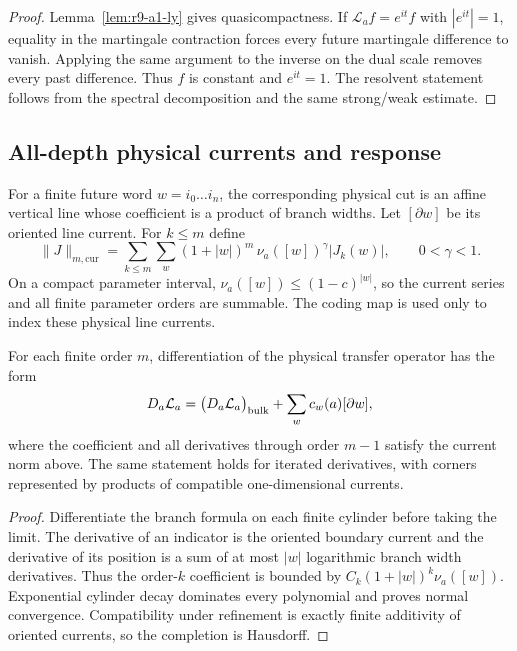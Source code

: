 \begin{proof}
Lemma~\ref{lem:r9-a1-ly} gives quasicompactness.  If
$\mathcal L_af=e^{it}f$ with $|e^{it}|=1$, equality in the martingale
contraction forces every future martingale difference to vanish.  Applying the
same argument to the inverse on the dual scale removes every past difference.
Thus $f$ is constant and $e^{it}=1$.  The resolvent statement follows from the
spectral decomposition and the same strong/weak estimate.
\end{proof}

\subsection{All-depth physical currents and response}

For a finite future word $w=i_0\ldots i_n$, the corresponding physical cut is
an affine vertical line whose coefficient is a product of branch widths.  Let
$[\partial w]$ be its oriented line current.  For $k\le m$ define
\[
 \|J\|_{m,\mathrm{cur}}
 =\sum_{k\le m}\sum_{w}
 (1+|w|)^m\,\nu_a([w])^\gamma
 |J_k(w)|,
 \qquad 0<\gamma<1.
\]
On a compact parameter interval,
$\nu_a([w])\le(1-c)^{|w|}$, so the current series and all finite parameter
orders are summable.  The coding map is used only to index these physical
line currents.

\begin{lemma}
\label{lem:r9-a1-current}
For each finite order $m$, differentiation of the physical transfer operator
has the form
\[
 D_a\mathcal L_a=\bigl(D_a\mathcal L_a\bigr)_{\rm bulk}
 +\sum_w c_w(a)[\partial w],
\]
where the coefficient and all derivatives through order $m-1$ satisfy the
current norm above.  The same statement holds for iterated derivatives, with
corners represented by products of compatible one-dimensional currents.
\end{lemma}

\begin{proof}
Differentiate the branch formula on each finite cylinder before taking the
limit.  The derivative of an indicator is the oriented boundary current and
the derivative of its position is a sum of at most $|w|$ logarithmic branch
width derivatives.  Thus the order-$k$ coefficient is bounded by
$C_k(1+|w|)^k\nu_a([w])$.  Exponential cylinder decay dominates every
polynomial and proves normal convergence.  Compatibility under refinement is
exactly finite additivity of oriented currents, so the completion is
Hausdorff.
\end{proof}


